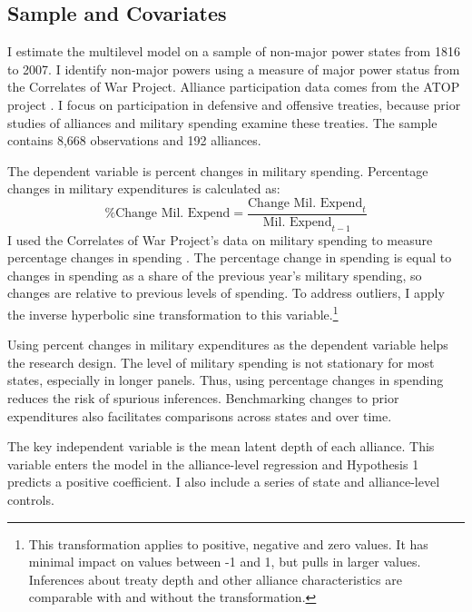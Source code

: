 \documentclass[12pt]{article}
\begin{document}
\subsection{Sample and Covariates} 

I estimate the multilevel model on a sample of non-major power states from 1816 to 2007. 
I identify non-major powers using a measure of major power status from the Correlates of War Project. 
Alliance participation data comes from the ATOP project \citep{Leedsetal2002}.  
I focus on participation in defensive and offensive treaties, because prior studies of alliances and military spending examine these treaties. 
The sample contains 8,668 observations and 192 alliances. 


The dependent variable is percent changes in military spending.
Percentage changes in military expenditures is calculated as:
\begin{equation}
\mbox{\% Change Mil. Expend} = \frac{ \mbox{Change Mil. Expend}_t }{ \mbox{Mil. Expend}_{t-1} }
\end{equation} 
I used the Correlates of War Project's data on military spending to measure percentage changes in spending \citep{SingerCINC1988}. 
The percentage change in spending is equal to changes in spending as a share of the previous year's military spending, so changes are relative to previous levels of spending. 
To address outliers, I apply the inverse hyperbolic sine transformation to this variable.\footnote{This transformation applies to positive, negative and zero values. It has minimal impact on values between -1 and 1, but pulls in larger values. Inferences about treaty depth and other alliance characteristics are comparable with and without the transformation.}


Using percent changes in military expenditures as the dependent variable helps the research design. 
The level of military spending is not stationary for most states, especially in longer panels. 
Thus, using percentage changes in spending reduces the risk of spurious inferences.
Benchmarking changes to prior expenditures also facilitates comparisons across states and over time. 


The key independent variable is the mean latent depth of each alliance. 
This variable enters the model in the alliance-level regression and Hypothesis 1 predicts a positive coefficient. 
I also include a series of state and alliance-level controls. 
\end{document}
